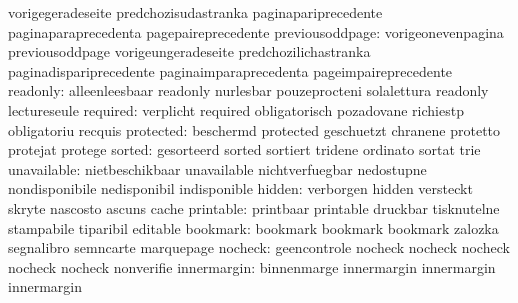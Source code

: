                            vorigegeradeseite         predchozisudastranka
                           paginapariprecedente      paginaparaprecedenta
                           pagepaireprecedente
          previousoddpage: vorigeonevenpagina        previousoddpage
                           vorigeungeradeseite       predchozilichastranka
                           paginadispariprecedente   paginaimparaprecedenta
                           pageimpaireprecedente
                 readonly: alleenleesbaar            readonly
                           nurlesbar                 pouzeprocteni
                           solalettura               readonly
                           lectureseule
                 required: verplicht                 required
                           obligatorisch             pozadovane
                           richiestp                 obligatoriu
                           recquis
                protected: beschermd                 protected
                           geschuetzt                chranene
                           protetto                  protejat
                           protege
                   sorted: gesorteerd                sorted
                           sortiert                  tridene
                           ordinato                  sortat
                           trie
              unavailable: nietbeschikbaar           unavailable
                           nichtverfuegbar           nedostupne
                           nondisponibile            nedisponibil
                           indisponible
                   hidden: verborgen                 hidden
                           versteckt                 skryte
                           nascosto                  ascuns
                           cache
                printable: printbaar                 printable
                           druckbar                  tisknutelne
                           stampabile                tiparibil
                           editable
                 bookmark: bookmark                  bookmark
                           bookmark                  zalozka
                           segnalibro                semncarte
                           marquepage
                  nocheck: geencontrole              nocheck
                           nocheck                   nocheck
                           nocheck                   nocheck
                           nonverifie
              innermargin: binnenmarge               innermargin
                           innermargin               innermargin
